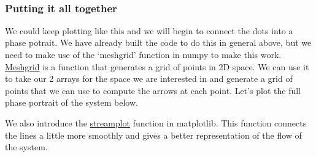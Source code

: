 \documentclass[11pt]{article}
\begin{document}
    \begin{center}
    \end{center}
    { \hspace*{\fill} \\}
    
    \subsubsection{Putting it all together}\label{putting-it-all-together}

We could keep plotting like this and we will begin to connect the dots
into a phase potrait. We have already built the code to do this in
general above, but we need to make use of the `meshgrid' function in
numpy to make this work.
\href{https://numpy.org/doc/stable/reference/generated/numpy.meshgrid.html}{Meshgrid}
is a function that generates a grid of points in 2D space. We can use it
to take our 2 arrays for the space we are interested in and generate a
grid of points that we can use to compute the arrows at each point.
Let's plot the full phase portrait of the system below.

We also introduce the
\href{https://matplotlib.org/stable/api/_as_gen/matplotlib.pyplot.streamplot.html}{streamplot}
function in matplotlib. This function connects the lines a little more
smoothly and gives a better representation of the flow of the system.
\end{document}
